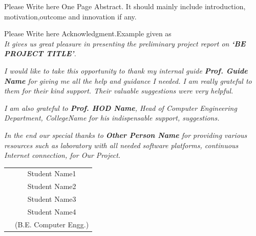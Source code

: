 \documentclass[oneside,a4paper,12pt]{report}
\begin{document}
\newpage

\setcounter{page}{0}
\frontmatter
{}
\rfoot{\thepage}

		
{   \setlength{\parindent}{11mm} }
{ \setlength{\parindent}{0mm} }
Please Write here One Page Abstract. It should mainly include introduction, motivation,outcome and innovation if any.


{   \setlength{\parindent}{11mm} }
{ \setlength{\parindent}{0mm} }
Please Write here Acknowledgment.Example given as\\
\textit{It gives us great pleasure in presenting the preliminary project report 
on {\bfseries \fontsize{12}{12} \selectfont `BE PROJECT TITLE'}.}
\vspace*{1.5\baselineskip}

 \textit{I would like to take this opportunity to thank my internal guide
 \textbf{Prof. Guide Name} for giving me all the help and guidance I needed. I am
 really grateful to them for their kind support. Their valuable suggestions were very helpful.} \vspace*{1.5\baselineskip}

 \textit{I am also grateful to \textbf{Prof. HOD Name}, Head of Computer
 Engineering Department, CollegeName for his indispensable
 support, suggestions.}
\vspace*{1.5\baselineskip}

\textit{In the end our special thanks to \textbf{Other Person Name} for
providing various resources such as  laboratory with all needed software platforms,
continuous Internet connection, for Our Project.}
\vspace*{3\baselineskip} \\
\begin{tabular}{p{8.2cm}c}
&Student Name1\\
&Student Name2\\
&Student Name3\\
&Student Name4\\
&(B.E. Computer Engg.)
\end{tabular}
\end{document}
